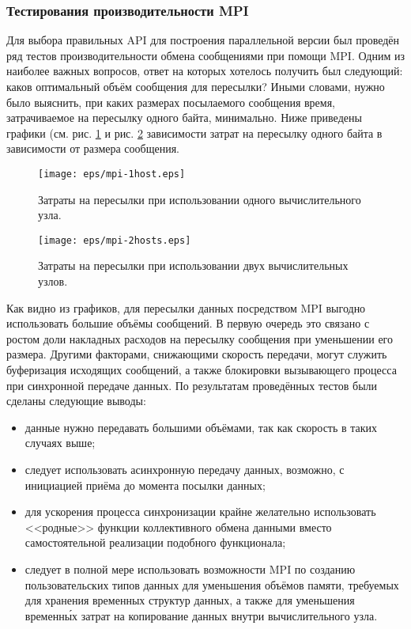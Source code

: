 \subsubsection{Тестирования производительности MPI}
Для выбора правильных API для построения параллельной версии был проведён ряд тестов производительности обмена сообщениями при помощи MPI. Одним из наиболее важных вопросов, ответ на которых хотелось получить был следующий: каков оптимальный объём сообщения для пересылки? Иными словами, нужно было выяснить, при каких размерах посылаемого сообщения время, затрачиваемое на пересылку одного байта, минимально.
Ниже приведены графики (см. рис. \ref{pic:mpi1host} и рис. \ref{pic:mpi2hosts} зависимости затрат на пересылку одного байта в зависимости от размера сообщения.
\begin{figure}[htp]
\centering
\texttt{[image: eps/mpi-1host.eps]}
\caption{Затраты на пересылки при использовании одного вычислительного
 узла.}
\label{pic:mpi1host}
\end{figure}
\begin{figure}[htp]
\centering
\texttt{[image: eps/mpi-2hosts.eps]}
\caption{Затраты на пересылки при использовании двух вычислительных узлов.}
\label{pic:mpi2hosts}
\end{figure}
Как видно из графиков, для пересылки данных посредством MPI выгодно использовать
большие объёмы сообщений. В первую очередь это связано с ростом доли накладных
расходов на пересылку сообщения при уменьшении его размера. Другими факторами,
снижающими скорость передачи, могут служить буферизация исходящих сообщений, а
также блокировки вызывающего процесса при синхронной передаче данных. По
результатам проведённых тестов были сделаны следующие выводы:
\begin{itemize}
	\item данные нужно передавать большими объёмами, так как скорость в таких случаях выше;
	\item следует использовать асинхронную передачу данных, возможно, с инициацией приёма до момента посылки данных;
	\item для ускорения процесса синхронизации крайне желательно использовать <<родные>> функции коллективного обмена данными вместо самостоятельной реализации подобного функционала;
	\item следует в полной мере использовать возможности MPI по созданию пользовательских типов данных для уменьшения объёмов памяти, требуемых для хранения временных структур данных, а также для уменьшения временн\'{ы}х затрат на копирование данных внутри вычислительного узла.
\end{itemize}

